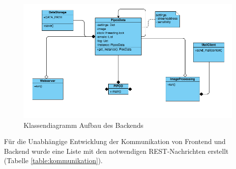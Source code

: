 \begin{figure}[]
	\centering
	\includegraphics[width=\textwidth]{content/pictures/classdiagramm.png}
	\caption{Klassendiagramm Aufbau des Backends}
	\label{img:backend-classdiagramm}
\end{figure}
Für die Unabhängige Entwicklung der Kommunikation von Frontend und Backend wurde eine Liste mit den notwendigen REST-Nachrichten erstellt (Tabelle \ref{table:kommunikation}).\\\\
